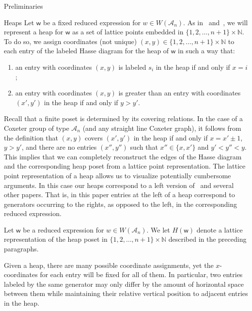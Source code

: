 \documentclass[11pt]{amsart}
\theoremstyle{definition}
\numberwithin{equation}{section}
\newcommand{\N}{\mathbb{N}}
\newcommand{\A}{\mathcal{A}}
\renewcommand{\(}{\left(}
\renewcommand{\)}{\right)}
\newcommand{\w}{\mathsf{w}}
\begin{document}
\begin{section}{Preliminaries}
\begin{subsection}{Heaps}
Let $\w$ be a fixed reduced expression for $w \in W(\A_{n})$.  As in~\cite{Billey2007} and~\cite{Ernst2010}, we will represent a heap for $\w$ as a set of lattice points embedded in $\{1,2,\ldots,n+1\} \times \mathbb{N}$.  To do so, we assign coordinates (not unique) $(x,y) \in \{1,2,\ldots, n+1\} \times \mathbb{N}$ to each entry of the labeled Hasse diagram for the heap of $\w$ in such a way that:
\begin{enumerate}
\item an entry with coordinates $(x,y)$ is labeled $s_i$ in the heap if and only if $x = i$; 
\item an entry with coordinates $(x,y)$ is greater than an entry with coordinates $(x',y')$ in the heap if and only if $y > y'$.
\end{enumerate}
Recall that a finite poset is determined by its covering relations.  In the case of a Coxeter group of type $\A_{n}$ (and any straight line Coxeter graph), it follows from the definition that $(x,y)$ covers $(x',y')$ in the heap if and only if $x = x' \pm 1$, $y > y'$, and there are no entries $(x'', y'')$ such that $x'' \in \{x, x'\}$ and $y'< y'' < y$.  This implies that we can completely reconstruct the edges of the Hasse diagram and the corresponding heap poset from a lattice point representation. The lattice point representation of a heap allows us to visualize potentially cumbersome arguments.  In this case our heaps correspond to a left version of~\cite{Billey2007} and several other papers.  That is, in this paper entries at the left of a heap correspond to generators occurring to the rights, as opposed to the left, in the corresponding reduced expression. 

Let $\w$ be a reduced expression for $w \in W(\A_{n})$.  We let $H(\w)$ denote a lattice representation of the heap poset in $\{1,2,\ldots,n+1\} \times \N$ described in the preceding paragraphs.  

Given a heap, there are many possible coordinate assignments, yet the $x$-coordinates for each entry will be fixed for all of them.  In particular, two entries labeled by the same generator may only differ by the amount of horizontal space between them while maintaining their relative vertical position to adjacent entries in the heap.


\end{subsection}
\end{section}
\end{document}
